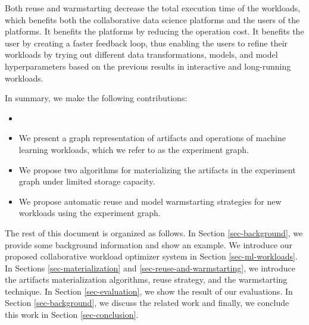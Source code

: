 Both reuse and warmstarting decrease the total execution time of the workloads, which benefits both the collaborative data science platforms and the users of the platforms.
It benefits the platforms by reducing the operation cost.
It benefits the user by creating a faster feedback loop, thus enabling the users to refine their workloads by trying out different data transformations, models, and model hyperparameters based on the previous results in interactive and long-running workloads.

In summary, we make the following contributions:
\begin{itemize}
\item {}
\item We present a graph representation of artifacts and operations of machine learning workloads, which we refer to as the experiment graph.
\item We propose two algorithms for materializing the artifacts in the experiment graph under limited storage capacity.
\item We propose automatic reuse and model warmstarting strategies for new workloads using the experiment graph.
\end{itemize}

The rest of this document is organized as follows.
In Section \ref{sec-background}, we provide some background information and show an example.
We introduce our proposed collaborative workload optimizer system in Section \ref{sec-ml-workloads}.
In Sections \ref{sec-materialization} and \ref{sec-reuse-and-warmstarting}, we introduce the artifacts materialization algorithms, reuse strategy, and the warmstarting technique. 
In Section \ref{sec-evaluation}, we show the result of our evaluations.
In Section \ref{sec-background}, we discuss the related work and finally, we conclude this work in Section \ref{sec-conclusion}.